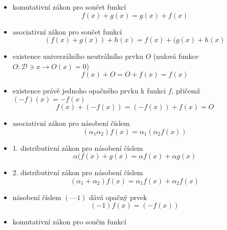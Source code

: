{      \begin{itemize}\addtolength{\itemsep}{-0.5\baselineskip}
        \item komutativní zákon pro součet funkcí
          \begin{equation}\label{mai:eq012}
            f(x) + g(x) = g(x) + f(x)
          \end{equation}
        \item asociativní zákon pro součet funkcí  
          \begin{equation}\label{mai:eq013}
            (f(x) + g(x)) + h(x) = f(x) + (g(x) + h(x)
          \end{equation}
        \item existence univerzálního neutrálního  prvku \(O\) (nulová funkce \(O:\mathcal{D}\ni x 
          \rightarrow O(x)=0\))
          \begin{equation}\label{mai:eq014}
            f(x) + O = O + f(x) = f(x)
          \end{equation}
        \item existence právě jednoho opačného prvku k funkci \(f\), přičemž \((-f)(x) = -f(x)\)
          \begin{equation}\label{mai:eq015}
            f(x)+(-f(x))=(-f(x))+f(x)=O
          \end{equation}
        \item asociativní zákon pro násobení číslem 
         \begin{equation}\label{mai:eq016}
            (\alpha_1\alpha_2)f(x) = \alpha_1(\alpha_2f(x))
         \end{equation}
        \item  1. distributivní zákon pro násobení číslem
          \begin{equation}\label{mai:eq017}
            \alpha(f(x)+g(x) =\alpha f(x) + \alpha g(x)
          \end{equation}\label{mai:eq018}
        \item 2. distributivní zákon pro násobení číslem 
          \begin{equation}\label{mai:eq019}
            (\alpha_1+\alpha_2)f(x) =\alpha_1f(x)+\alpha_2f(x)
          \end{equation}
        \item násobení číslem \((—1)\) dává opačný prvek
          \begin{equation}\label{mai:eq020}
            (-1)f(x)=(-f(x))
          \end{equation}
        \item komutativní zákon pro součin funkcí

\end{itemize}}
